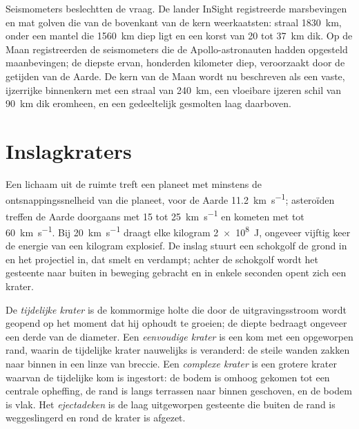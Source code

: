 Seismometers beslechtten de vraag. De lander InSight registreerde
marsbevingen en mat golven die van de bovenkant van de kern weerkaatsten: straal
\qty{1830}{km}, onder een mantel die \qty{1560}{km} diep ligt en een korst van 20 tot
\qty{37}{km} dik. Op de Maan registreerden de seismometers die de Apollo-astronauten
hadden opgesteld maanbevingen; de diepste ervan, honderden
kilometer diep, veroorzaakt door de getijden van de Aarde. De kern van de Maan wordt nu
beschreven als een vaste, ijzerrijke binnenkern met een straal van \qty{240}{km}, een
vloeibare ijzeren schil van \qty{90}{km} dik eromheen, en een gedeeltelijk gesmolten
laag daarboven.

\section{Inslagkraters}\label{sec:b3:planetary-interiors-surfaces:impacts}

Een lichaam uit de ruimte treft een planeet met minstens de ontsnappingssnelheid van
die planeet, voor de Aarde \qty{11.2}{km.s^{-1}}; asteroïden treffen de Aarde doorgaans met
15 tot \qty{25}{km.s^{-1}} en kometen met tot
\qty{60}{km.s^{-1}}. Bij \qty{20}{km.s^{-1}} draagt elke kilogram
\qty{2e8}{J}, ongeveer vijftig keer de energie van een kilogram explosief. De
inslag stuurt een schokgolf de grond in en het projectiel in, dat
smelt en verdampt; achter de schokgolf wordt het gesteente naar buiten in beweging gebracht en
in enkele seconden opent zich een krater.

\begin{definition}\label{def:b3:planetary-interiors-surfaces:crater-morphology}
De \emph{tijdelijke krater} is de kommormige holte die door de uitgravingsstroom
wordt geopend op het moment dat hij ophoudt te groeien; de diepte bedraagt ongeveer een derde
van de diameter. Een \emph{eenvoudige
krater} is een kom met een opgeworpen rand, waarin de tijdelijke krater
nauwelijks is veranderd: de steile wanden zakken naar binnen in een linze van
breccie. Een \emph{complexe krater} is een grotere krater waarvan de
tijdelijke kom is ingestort: de bodem is omhoog gekomen tot een centrale opheffing, de
rand is langs terrassen naar binnen geschoven, en de bodem is vlak. Het \emph{ejectadeken}
is de laag uitgeworpen gesteente die buiten de rand is weggeslingerd en
rond de krater is afgezet.
\end{definition}

